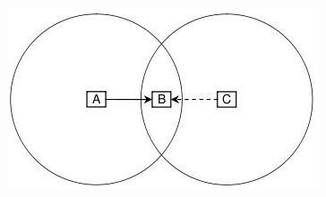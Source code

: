  \begin{figure}[H]
\centering
\includegraphics[scale=0.6]{res/img/30_StazioneNascosta.png}
\end{figure} 